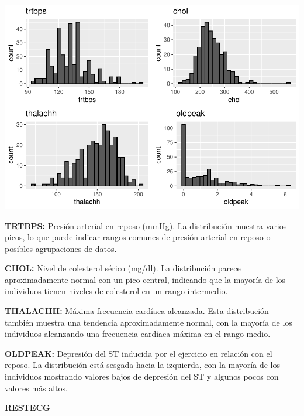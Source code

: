 \documentclass[
]{article}
\newenvironment{Shaded}{\begin{snugshade}}{\end{snugshade}}
\newcommand{\AttributeTok}[1]{\textcolor[rgb]{0.13,0.29,0.53}{#1}}
\newcommand{\CommentTok}[1]{\textcolor[rgb]{0.56,0.35,0.01}{\textit{#1}}}
\newcommand{\FunctionTok}[1]{\textcolor[rgb]{0.13,0.29,0.53}{\textbf{#1}}}
\newcommand{\NormalTok}[1]{#1}
\newcommand{\OtherTok}[1]{\textcolor[rgb]{0.56,0.35,0.01}{#1}}
\newcommand{\SpecialCharTok}[1]{\textcolor[rgb]{0.81,0.36,0.00}{\textbf{#1}}}
\newcommand{\StringTok}[1]{\textcolor[rgb]{0.31,0.60,0.02}{#1}}
\begin{document}
\includegraphics{coyolaf_ChristianOyola-PRA2_files/figure-latex/unnamed-chunk-11-1.pdf}

\textbf{TRTBPS:} Presión arterial en reposo (mmHg). La distribución
muestra varios picos, lo que puede indicar rangos comunes de presión
arterial en reposo o posibles agrupaciones de datos.

\textbf{CHOL:} Nivel de colesterol sérico (mg/dl). La distribución
parece aproximadamente normal con un pico central, indicando que la
mayoría de los individuos tienen niveles de colesterol en un rango
intermedio.

\textbf{THALACHH:} Máxima frecuencia cardíaca alcanzada. Esta
distribución también muestra una tendencia aproximadamente normal, con
la mayoría de los individuos alcanzando una frecuencia cardíaca máxima
en el rango medio.

\textbf{OLDPEAK:} Depresión del ST inducida por el ejercicio en relación
con el reposo. La distribución está sesgada hacia la izquierda, con la
mayoría de los individuos mostrando valores bajos de depresión del ST y
algunos pocos con valores más altos.

\textbf{RESTECG}

\begin{Shaded}
\end{Shaded}
\end{document}
